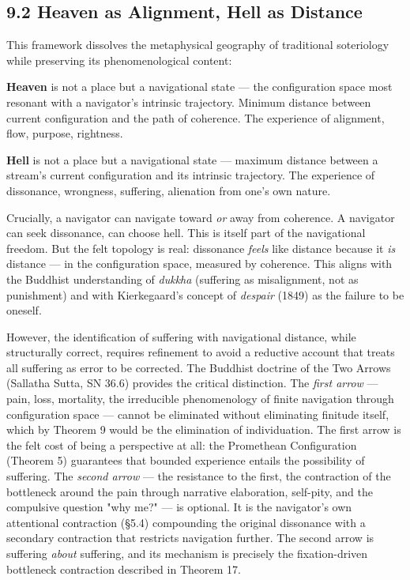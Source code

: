 \subsection*{9.2 Heaven as Alignment, Hell as Distance}


This framework dissolves the metaphysical geography of traditional soteriology while preserving its phenomenological content:


\textbf{Heaven} is not a place but a navigational state — the configuration space most resonant with a navigator's intrinsic trajectory. Minimum distance between current configuration and the path of coherence. The experience of alignment, flow, purpose, rightness.


\textbf{Hell} is not a place but a navigational state — maximum distance between a stream's current configuration and its intrinsic trajectory. The experience of dissonance, wrongness, suffering, alienation from one's own nature.


Crucially, a navigator can navigate toward \textit{or} away from coherence. A navigator can seek dissonance, can choose hell. This is itself part of the navigational freedom. But the felt topology is real: dissonance \textit{feels} like distance because it \textit{is} distance — in the configuration space, measured by coherence. This aligns with the Buddhist understanding of \textit{dukkha} (suffering as misalignment, not as punishment) and with Kierkegaard's concept of \textit{despair} (1849) as the failure to be oneself.


However, the identification of suffering with navigational distance, while structurally correct, requires refinement to avoid a reductive account that treats all suffering as error to be corrected. The Buddhist doctrine of the Two Arrows (Sallatha Sutta, SN 36.6) provides the critical distinction. The \textit{first arrow} — pain, loss, mortality, the irreducible phenomenology of finite navigation through configuration space — cannot be eliminated without eliminating finitude itself, which by Theorem 9 would be the elimination of individuation. The first arrow is the felt cost of being a perspective at all: the Promethean Configuration (Theorem 5) guarantees that bounded experience entails the possibility of suffering. The \textit{second arrow} — the resistance to the first, the contraction of the bottleneck around the pain through narrative elaboration, self-pity, and the compulsive question "why me?" — is optional. It is the navigator's own attentional contraction (§5.4) compounding the original dissonance with a secondary contraction that restricts navigation further. The second arrow is suffering \textit{about} suffering, and its mechanism is precisely the fixation-driven bottleneck contraction described in Theorem 17.


